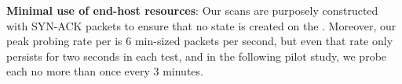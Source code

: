 \textbf{Minimal use of end-host resources}: Our scans are purposely
  constructed with SYN-ACK packets to ensure that no state is created
  on the {}.  Moreover, our peak probing rate per {} 
  is 6 min-sized packets per second, but even that rate only persists for
  two seconds in each test, and in the following pilot study, 
  we probe each {} no more than once every 3 minutes.

